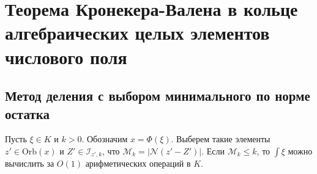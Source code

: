 \documentclass[_00_dissertation.tex]{subfiles}
\begin{document}
\section{Теорема Кронекера-Валена в кольце алгебраических целых элементов числового поля}

\subsection{Метод деления с выбором минимального по норме остатка}

\begin{lemma}
    Пусть $\xi \in K$ и $k > 0$.
    Обозначим $x = \Phi(\xi)$.
    Выберем такие элементы $z' \in \textrm{Orb}(x)$ и $Z'\in\mathcal{I}_{z', k}$, что $\mathcal{M}_k = |\mathcal{N}(z'-Z')|$.
    Если $\mathcal{M}_k \le k$, то $\int{\xi}$ можно вычислить за $O(1)$ арифметических операций в $K$.
\end{lemma}
\end{document}

